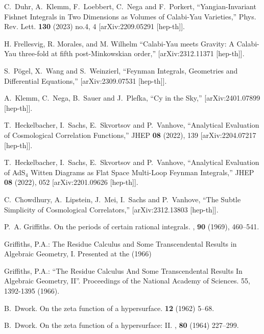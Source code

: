 \documentclass[a4paper,12pt]{article}
\numberwithin{equation}{section}
\numberwithin{figure}{section}
\begin{document}
\begin{thebibliography}{99}
C.~Duhr, A.~Klemm, F.~Loebbert, C.~Nega and F.~Porkert,
``Yangian-Invariant Fishnet Integrals in Two Dimensions as Volumes of Calabi-Yau Varieties,''
Phys. Rev. Lett. \textbf{130} (2023) no.4, 4
[arXiv:2209.05291 [hep-th]].

H. Frellesvig, R. Morales, and M. Wilhelm
``Calabi-Yau meets Gravity: A Calabi-Yau three-fold at fifth post-Minkowskian order,''
[arXiv:2312.11371 [hep-th]].

S.~P\"ogel, X.~Wang and S.~Weinzierl,
``Feynman Integrals, Geometries and Differential Equations,''
[arXiv:2309.07531 [hep-th]].

A.~Klemm, C.~Nega, B.~Sauer and J.~Plefka,
``Cy in the Sky,''
[arXiv:2401.07899 [hep-th]].


T.~Heckelbacher, I.~Sachs, E.~Skvortsov and P.~Vanhove,
``Analytical Evaluation of Cosmological Correlation Functions,''
JHEP \textbf{08} (2022), 139
[arXiv:2204.07217 [hep-th]].

T.~Heckelbacher, I.~Sachs, E.~Skvortsov and P.~Vanhove,
``Analytical Evaluation of AdS$_{4}$ Witten Diagrams as Flat Space Multi-Loop Feynman Integrals,''
JHEP \textbf{08} (2022), 052
[arXiv:2201.09626 [hep-th]].

C.~Chowdhury, A.~Lipstein, J.~Mei, I.~Sachs and P.~Vanhove,
``The Subtle Simplicity of Cosmological Correlators,''
[arXiv:2312.13803 [hep-th]].


P.~A. Griffiths.
\newblock On the periods of certain rational integrals.
, {\bf 90} (1969), 460--541.


   Griffiths, P.A.: The Residue Calculus and Some
    Transcendental Results in Algebraic Geometry, I. Presented at the
    (1966)

    Griffiths, P.A.: ``The Residue Calculus And Some Transcendental
    Results In Algebraic Geometry, II''. Proceedings of the National
    Academy of Sciences. 55, 1392-1395
    (1966). %

B.~Dwork.
\newblock On the zeta function of a hypersurface.
 {\bf 12} (1962) 5--68.

B.~Dwork.
\newblock On the zeta function of a hypersurface: {{II}}.
, {\bf 80} (1964) 227--299.
  

\end{thebibliography}
\end{document}
